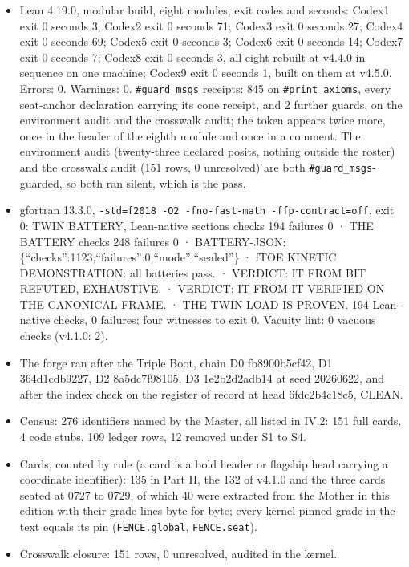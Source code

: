 \documentclass[10pt,twocolumn]{article}
\providecommand{\tightlist}{\setlength{\itemsep}{0pt}\setlength{\parskip}{0pt}}
\begin{document}
\begin{itemize}
\tightlist
\item
  Lean 4.19.0, modular build, eight modules, exit codes and seconds:
  Codex1 exit 0 seconds 3; Codex2 exit 0 seconds 71; Codex3 exit 0
  seconds 27; Codex4 exit 0 seconds 69; Codex5 exit 0 seconds 3; Codex6
  exit 0 seconds 14; Codex7 exit 0 seconds 7; Codex8 exit 0 seconds 3,
  all eight rebuilt at v4.4.0 in sequence on one machine; Codex9 exit 0
  seconds 1, built on them at v4.5.0. Errors: 0. Warnings: 0.
  \texttt{\#guard\_msgs} receipts: 845 on \texttt{\#print\ axioms},
  every seat-anchor declaration carrying its cone receipt, and 2 further
  guards, on the environment audit and the crosswalk audit; the token
  appears twice more, once in the header of the eighth module and once
  in a comment. The environment audit (twenty-three declared posits,
  nothing outside the roster) and the crosswalk audit (151 rows, 0
  unresolved) are both \texttt{\#guard\_msgs}-guarded, so both ran
  silent, which is the pass.
\item
  gfortran 13.3.0,
  \texttt{-std=f2018\ -O2\ -fno-fast-math\ -ffp-contract=off}, exit 0:
  TWIN BATTERY, Lean-native sections checks 194 failures 0 · THE BATTERY
  checks 248 failures 0 · BATTERY-JSON:
  \{``checks'':1123,``failures'':0,``mode'':``sealed''\} · fTOE KINETIC
  DEMONSTRATION: all batteries pass. · VERDICT: IT FROM BIT REFUTED,
  EXHAUSTIVE. · VERDICT: IT FROM IT VERIFIED ON THE CANONICAL FRAME. ·
  THE TWIN LOAD IS PROVEN. 194 Lean-native checks, 0 failures; four
  witnesses to exit 0. Vacuity lint: 0 vacuous checks (v4.1.0: 2).
\item
  The forge ran after the Triple Boot, chain D0 fb8900b5cf42, D1
  364d1cdb9227, D2 8a5dc7f98105, D3 1e2b2d2adb14 at seed 20260622, and
  after the index check on the register of record at head 6fdc2b4c18c5,
  CLEAN.
\item
  Census: 276 identifiers named by the Master, all listed in IV.2: 151
  full cards, 4 code stubs, 109 ledger rows, 12 removed under S1 to S4.
\item
  Cards, counted by rule (a card is a bold header or flagship head
  carrying a coordinate identifier): 135 in Part II, the 132 of v4.1.0
  and the three cards seated at 0727 to 0729, of which 40 were extracted
  from the Mother in this edition with their grade lines byte for byte;
  every kernel-pinned grade in the text equals its pin
  (\texttt{FENCE.global}, \texttt{FENCE.seat}).
\item
  Crosswalk closure: 151 rows, 0 unresolved, audited in the kernel.

\end{itemize}
\end{document}
